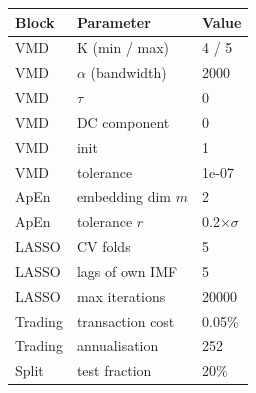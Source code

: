 \begin{tabular}{lll}
\toprule
Block & Parameter & Value \\
\midrule
VMD & K (min / max) & 4 / 5 \\
VMD & $\alpha$ (bandwidth) & 2000 \\
VMD & $\tau$ & 0 \\
VMD & DC component & 0 \\
VMD & init & 1 \\
VMD & tolerance & 1e-07 \\
ApEn & embedding dim $m$ & 2 \\
ApEn & tolerance $r$ & 0.2$\times\sigma$ \\
LASSO & CV folds & 5 \\
LASSO & lags of own IMF & 5 \\
LASSO & max iterations & 20000 \\
Trading & transaction cost & 0.05\% \\
Trading & annualisation & 252 \\
Split & test fraction & 20\% \\
\bottomrule
\end{tabular}
